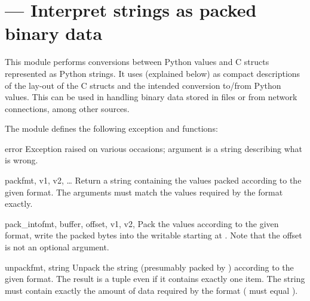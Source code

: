 \section{ ---
         Interpret strings as packed binary data}



This module performs conversions between Python values and C
structs represented as Python strings.  It uses 
(explained below) as compact descriptions of the lay-out of the C
structs and the intended conversion to/from Python values.  This can
be used in handling binary data stored in files or from network
connections, among other sources.

The module defines the following exception and functions:


\begin{excdesc}{error}
  Exception raised on various occasions; argument is a string
  describing what is wrong.
\end{excdesc}

\begin{funcdesc}{pack}{fmt, v1, v2, \textrm{\ldots}}
  Return a string containing the values
   packed according to the given
  format.  The arguments must match the values required by the format
  exactly.
\end{funcdesc}

\begin{funcdesc}{pack_into}{fmt, buffer, offset, v1, v2, \moreargs}
  Pack the values  according to the given
  format, write the packed bytes into the writable  starting at
  .
  Note that the offset is not an optional argument.

\end{funcdesc}

\begin{funcdesc}{unpack}{fmt, string}
  Unpack the string (presumably packed by ) according to the given format.  The result is a
  tuple even if it contains exactly one item.  The string must contain
  exactly the amount of data required by the format
  ( must equal ).
\end{funcdesc}

